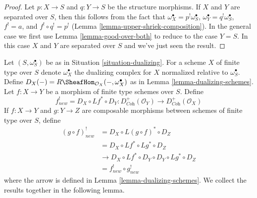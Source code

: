 \begin{proof}
Let $p : X \to S$ and $q : Y \to S$ be the structure morphisms.
If $X$ and $Y$ are separated over $S$, then this follows
from the fact that $\omega_X^\bullet = p^!\omega_S^\bullet$,
$\omega_Y^\bullet = q^!\omega_S^\bullet$, $f^! = a$, and
$f^! \circ q^! = p^!$ (Lemma \ref{lemma-upper-shriek-composition}).
In the general case we first use Lemma \ref{lemma-good-over-both}
to reduce to the case $Y = S$. In this case $X$ and $Y$
are separated over $S$ and we've just seen the result.
\end{proof}

\noindent
Let $(S, \omega_S^\bullet)$ be as in Situation \ref{situation-dualizing}.
For a scheme $X$ of finite type over $S$ denote $\omega_X^\bullet$ the
dualizing complex for $X$ normalized relative to $\omega_S^\bullet$.
Define $D_X(-) = R\SheafHom_{\mathcal{O}_X}(-, \omega_X^\bullet)$
as in Lemma \ref{lemma-dualizing-schemes}.
Let $f : X \to Y$ be a morphism of finite type schemes over $S$.
Define
$$
f_{new}^! = D_X \circ Lf^* \circ D_Y :
D_{\textit{Coh}}^+(\mathcal{O}_Y)
\to
D_{\textit{Coh}}^+(\mathcal{O}_X)
$$
If $f : X \to Y$ and $g : Y \to Z$ are composable
morphisms between schemes of finite type over $S$, define
\begin{align*}
(g \circ f)^!_{new} & = D_X \circ L(g \circ f)^* \circ D_Z \\
& = D_X \circ Lf^* \circ Lg^* \circ D_Z \\
& \to D_X \circ Lf^* \circ D_Y \circ D_Y \circ Lg^* \circ D_Z \\
& = f^!_{new} \circ g^!_{new}
\end{align*}
where the arrow is defined in Lemma \ref{lemma-dualizing-schemes}.
We collect the results together in the following lemma.

